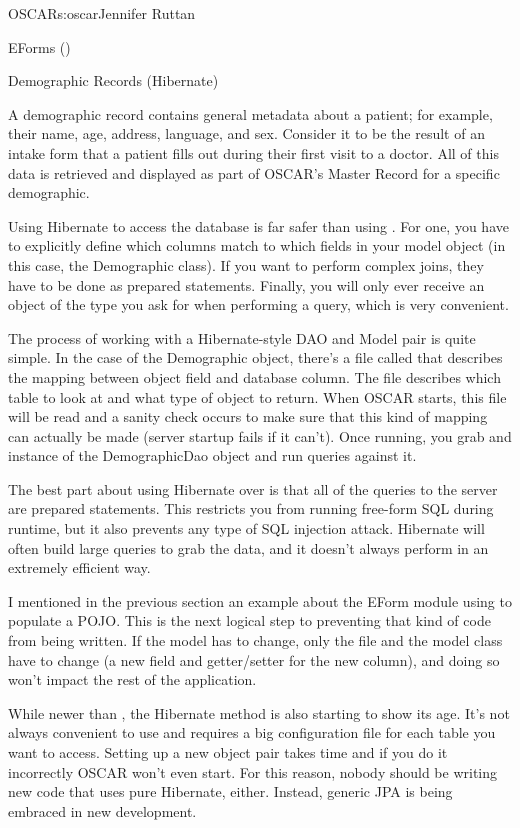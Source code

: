 \begin{aosachapter}{OSCAR}{s:oscar}{Jennifer Ruttan}
\begin{aosasect1}{EForms ()}
\end{aosasect1}

\begin{aosasect1}{Demographic Records (Hibernate)}

A demographic record contains general metadata about a patient; for
example, their name, age, address, language, and sex. Consider it to
be the result of an intake form that a patient fills out during their
first visit to a doctor. All of this data is retrieved and displayed
as part of OSCAR's Master Record for a specific demographic.

Using Hibernate to access the database is far safer than
using . For one, you have to explicitly define which
columns match to which fields in your model object (in this case, the
Demographic class). If you want to perform complex joins, they have to
be done as prepared statements. Finally, you will only ever receive an
object of the type you ask for when performing a query, which is very
convenient.

The process of working with a Hibernate-style DAO and Model pair is
quite simple. In the case of the Demographic object, there's a file
called  that describes the mapping between object
field and database column. The file describes which table to look at
and what type of object to return. When OSCAR starts, this file will
be read and a sanity check occurs to make sure that this kind of
mapping can actually be made (server startup fails if it can't). Once
running, you grab and instance of the DemographicDao object and run
queries against it.

The best part about using Hibernate over  is that all
of the queries to the server are prepared statements. This restricts
you from running free-form SQL during runtime, but it also prevents
any type of SQL injection attack. Hibernate will often build large
queries to grab the data, and it doesn't always perform in an
extremely efficient way.

I mentioned in the previous section an example about the EForm module
using  to populate a POJO. This is the next logical
step to preventing that kind of code from being written. If the model
has to change, only the  file and the model class have
to change (a new field and getter/setter for the new column), and
doing so won't impact the rest of the application.

While newer than , the Hibernate method is also
starting to show its age. It's not always convenient to use and
requires a big configuration file for each table you want to
access. Setting up a new object pair takes time and if you do it
incorrectly OSCAR won't even start. For this reason, nobody should be
writing new code that uses pure Hibernate, either. Instead, generic
JPA is being embraced in new development.


\end{aosasect1}
\end{aosachapter}
